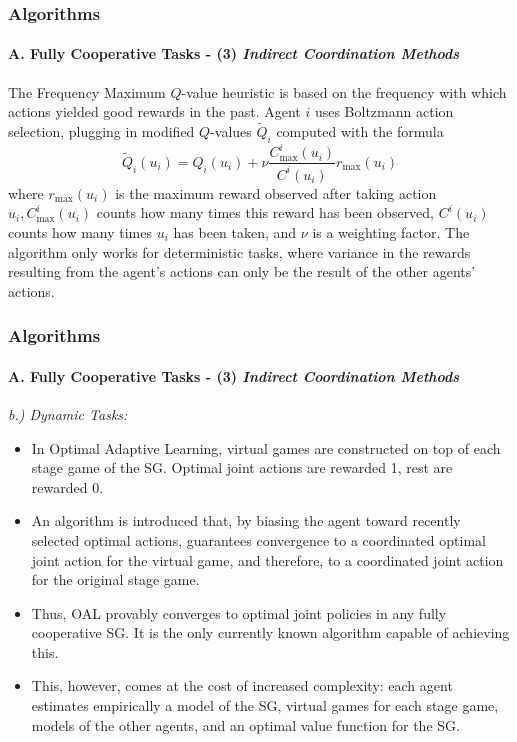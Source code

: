 \documentclass{beamer}
\begin{document}
\begin{frame}
\frametitle{Algorithms}
\framesubtitle{A. Fully Cooperative Tasks - (3) \textit{Indirect Coordination Methods}}
The Frequency Maximum $Q$-value heuristic is based on the frequency with which actions yielded good rewards in the past. Agent $i$ uses Boltzmann action selection, plugging in modified $Q$-values $\tilde{Q}_i$ computed with the formula
$$
\tilde{Q}_i\left(u_i\right)=Q_i\left(u_i\right)+\nu \frac{C_{\max }^i\left(u_i\right)}{C^i\left(u_i\right)} r_{\max }\left(u_i\right)
$$
where $r_{\max }\left(u_i\right)$ is the maximum reward observed after taking action $u_i, C_{\max }^i\left(u_i\right)$ counts how many times this reward has been observed, $C^i\left(u_i\right)$ counts how many times $u_i$ has been taken, and $\nu$ is a weighting factor. The algorithm only works for deterministic tasks, where variance in the rewards resulting from the agent's actions can only be the result of the other agents' actions.
\end{frame}

\begin{frame}
\frametitle{Algorithms}
\framesubtitle{A. Fully Cooperative Tasks - (3) \textit{Indirect Coordination Methods}}
\textit{b.) Dynamic Tasks:} \begin{itemize}
\item In Optimal Adaptive Learning, virtual games are constructed on top of each stage game of the SG. Optimal joint actions are rewarded 1, rest are rewarded 0. 
\item An algorithm is introduced that, by biasing the agent toward recently selected optimal actions, guarantees convergence to a coordinated optimal joint action for the virtual game, and therefore, to a coordinated joint action for the original stage game. 
\item Thus, OAL provably converges to optimal joint policies in any fully cooperative SG. It is the only currently known algorithm capable of achieving this. 
\item This, however, comes at the cost of increased complexity: each agent estimates empirically a model of the SG, virtual games for each stage game, models of the other agents, and an optimal value function for the SG.
\end{itemize}

\end{frame}
\end{document}
